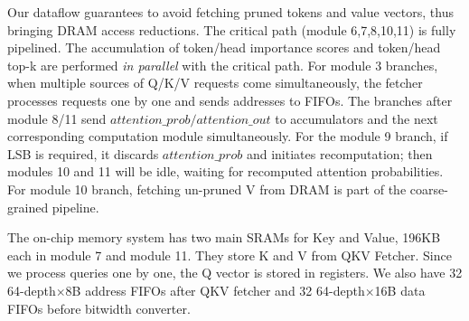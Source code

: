 Our dataflow guarantees to avoid fetching pruned tokens and value vectors, thus bringing DRAM access reductions. The critical path (module 6,7,8,10,11) is fully pipelined. The accumulation of token/head importance scores and token/head top-k are performed \emph{in parallel} with the critical path. For module 3 branches, when multiple sources of Q/K/V requests come simultaneously, the fetcher processes requests one by one and sends addresses to FIFOs. The branches after module 8/11 send $attention\_prob/attention\_out$ to accumulators and the next corresponding computation module simultaneously. For the module 9 branch, if LSB is required, it discards $attention\_prob$ and initiates recomputation; then modules 10 and 11 will be idle, waiting for recomputed attention probabilities. For module 10 branch, fetching un-pruned V from DRAM is part of the coarse-grained pipeline.


The on-chip memory system has two main SRAMs for Key and Value, 196KB each in module 7 and module 11. They store K and V from QKV Fetcher. Since we process queries one by one, the Q vector is stored in registers. We also have 32 64-depth$\times$8B address FIFOs after QKV fetcher and 32 64-depth$\times$16B data FIFOs before bitwidth converter.




